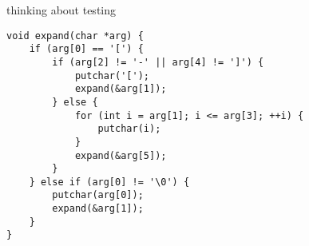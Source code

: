 
\begin{frame}[fragile,label=testExample]{thinking about testing}
    \lstset{language=C,style=smaller}
\begin{lstlisting}
void expand(char *arg) {
    if (arg[0] == '[') {
        if (arg[2] != '-' || arg[4] != ']') {
            putchar('[');
            expand(&arg[1]);
        } else {
            for (int i = arg[1]; i <= arg[3]; ++i) {
                putchar(i);
            }
            expand(&arg[5]);
        }
    } else if (arg[0] != '\0') {
        putchar(arg[0]);
        expand(&arg[1]);
    }
}
\end{lstlisting}
\end{frame}

